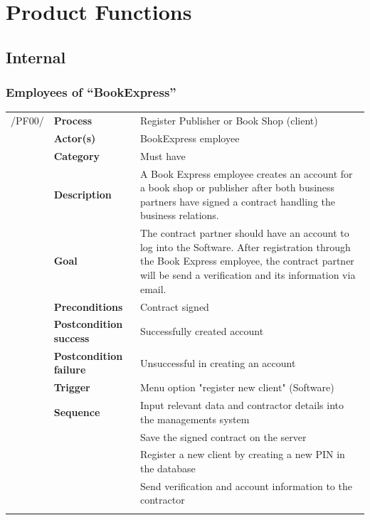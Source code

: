 \documentclass[11pt,a4paper,oneside,svgnames]{report}
\begin{document}
\chapter{Product Functions}

\section{Internal}
\subsection{Employees of ``BookExpress''}

\noindent
\begin{tabular}{p{1.5cm}p{3cm}p{8cm}}
/PF00/	& \textbf{Process}	& Register Publisher or Book Shop (client)\\
		& \textbf{Actor(s)} & BookExpress employee\\
		& \textbf{Category} & Must have\\
		& \textbf{Description}	 & A Book Express employee creates an account for a book shop or publisher after both business partners have signed a contract handling the business relations.\\
		& \textbf{Goal} & The contract partner should have an account to log into the Software. After registration through the Book Express employee, the contract partner will be send a verification and its 
		 information via email.\\
		& \textbf{Preconditions} & Contract signed\\
		& \textbf{Postcondition success} & Successfully created account\\
		& \textbf{Postcondition failure} & Unsuccessful in creating an account\\
		& \textbf{Trigger} & Menu option "register new client" (Software)\\
		& \textbf{Sequence} & Input relevant data and contractor details into the managements system\\
		& & Save the signed contract on the server\\
		& & Register a new client by creating a new PIN in the database\\
		& & Send verification and account information to the contractor\\
\hfill \\
\end{tabular}
\end{document}
